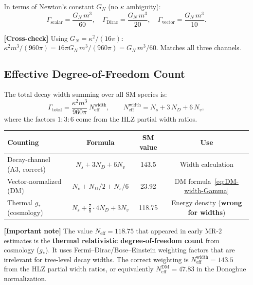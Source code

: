 \documentclass[11pt,a4paper]{article}
\theoremstyle{plain}
\theoremstyle{definition}
\theoremstyle{remark}
\newcommand{\Neff}{N_{\mathrm{eff}}}
\newcommand{\signcorrection}[1]{%
  \par\smallskip\noindent
  \colorbox{red!10}{\parbox{\dimexpr\linewidth-2\fboxsep}{%
    \textcolor{red!60!black}{\textbf{[Important note]}} #1}}%
  \par\smallskip}
\newcommand{\crosscheck}[1]{%
  \par\smallskip\noindent
  \colorbox{blue!10}{\parbox{\dimexpr\linewidth-2\fboxsep}{%
    \textcolor{blue!50!black}{\textbf{[Cross-check]}} #1}}%
  \par\smallskip}
\begin{document}
In terms of Newton's constant $G_N$ (no $\kappa$ ambiguity):
\begin{equation}\label{eq:partial-widths-G}
  \boxed{
  \Gamma_{\mathrm{scalar}} = \frac{G_N\,m^3}{60},
  \quad
  \Gamma_{\mathrm{Dirac}} = \frac{G_N\,m^3}{20},
  \quad
  \Gamma_{\mathrm{vector}} = \frac{G_N\,m^3}{10}.}
\end{equation}

\crosscheck{Using $G_N = \kappa^2/(16\pi)$:
$\kappa^2 m^3/(960\pi) = 16\pi G_N\,m^3/(960\pi) = G_N\,m^3/60$.
Matches all three channels.}

\subsection{Effective Degree-of-Freedom Count}
\label{sec:Neff}

The total decay width summing over all SM species is:
\begin{equation}\label{eq:Gamma-total}
  \Gamma_{\mathrm{total}}
  = \frac{\kappa^2 m^3}{960\pi}\,\Neff^{\mathrm{width}},
  \qquad
  \Neff^{\mathrm{width}} = N_s + 3\,N_D + 6\,N_v,
\end{equation}
where the factors $1:3:6$ come from the HLZ partial width ratios.

\begin{center}
\begin{tabular}{lccc}
\toprule
Counting & Formula & SM value & Use \\
\midrule
Decay-channel (A3, correct) & $N_s + 3N_D + 6N_v$ & 143.5
  & Width calculation \\
Vector-normalized (DM) & $N_v + N_D/2 + N_s/6$ & 23.92
  & DM formula~\eqref{eq:DM-width-Gamma} \\
Thermal $g_*$ (cosmology) & $N_s + \frac{7}{8}\cdot 4N_D + 3N_v$
  & 118.75 & Energy density (\textbf{wrong for widths}) \\
\bottomrule
\end{tabular}
\end{center}

\signcorrection{The value $\Neff = 118.75$ that appeared in early MR-2
estimates is the \textbf{thermal relativistic degree-of-freedom count}
from cosmology ($g_*$).  It uses Fermi--Dirac/Bose--Einstein weighting
factors that are irrelevant for tree-level decay widths.  The correct
weighting is $\Neff^{\mathrm{width}} = 143.5$ from the HLZ partial
width ratios, or equivalently $\Neff^{\mathrm{DM}} = 47.83$ in the
Donoghue normalization.}


\end{document}
